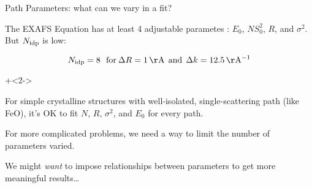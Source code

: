 
\begin{slide}{Path Parameters: what can we vary in a fit?}

\begin{cenpage}{108mm}
  The EXAFS Equation has at least 4 adjustable parametes {}:
  $E_0$, $NS_0^2$, $R$, and $\sigma^2$.  \hspace{5mm}     But $N_{\rm idp}$  is low:

  \[ N_{\rm idp} = 8 \> \> \>
  {\rm for} \> \Delta R = 1 \, {\rm \AA} \>\> {\rm and} \>\> \Delta k = 12.5\,
  {\rm \AA^{-1} } \]

  \vmm\onslide+<2->

  For simple crystalline structures with well-isolated, single-scattering
  path (like FeO), it's OK to fit $N$, $R$, $\sigma^2$, and $E_0$ for every
  path.

  \vmm

  For more complicated problems, we need a way to limit the number of
  parameters varied.

  \vmm

  We might {\emph{want}} to impose relationships between parameters to get
  more meaningful results\ldots


\end{cenpage}
\vfill
\end{slide}


